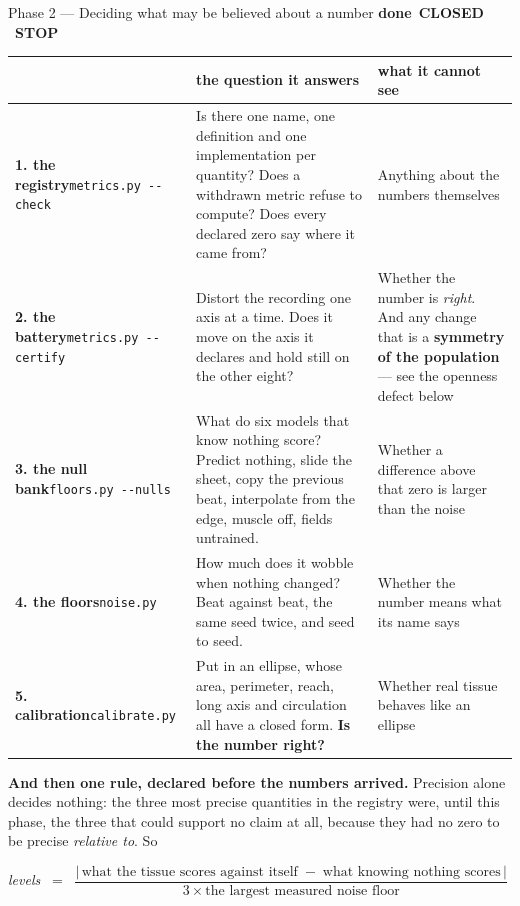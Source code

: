 \documentclass[11pt,a4paper]{article}
\newcommand{\code}[1]{\texttt{#1}}
\newcommand{\dn}{\textcolor{good}{\textbf{done}}}
\newcommand{\stopp}{\textcolor{bad!30!white}{\textbf{STOP}}}
\begin{document}
\begin{phasebox}{Phase 2 --- Deciding what may be believed about a number \hfill \dn\ \textbf{CLOSED} \ \stopp}
\begin{center}\footnotesize
\begin{tabular}{@{}l p{5.0cm} p{4.6cm}@{}}
\toprule
& \textbf{the question it answers} & \textbf{what it cannot see}\\
\midrule
\textbf{1. the registry}\newline\code{metrics.py -{}-check} &
Is there one name, one definition and one implementation per quantity? Does a withdrawn metric
refuse to compute? Does every declared zero say where it came from? &
Anything about the numbers themselves\\
\addlinespace
\textbf{2. the battery}\newline\code{metrics.py -{}-certify} &
Distort the recording one axis at a time. Does it move on the axis it declares and hold still on the
other eight? &
Whether the number is \emph{right}. And any change that is a \textbf{symmetry of the population} ---
see the openness defect below\\
\addlinespace
\textbf{3. the null bank}\newline\code{floors.py -{}-nulls} &
What do six models that know nothing score? Predict nothing, slide the sheet, copy the previous
beat, interpolate from the edge, muscle off, fields untrained. &
Whether a difference above that zero is larger than the noise\\
\addlinespace
\textbf{4. the floors}\newline\code{noise.py} &
How much does it wobble when nothing changed? Beat against beat, the same seed twice, and seed to
seed. &
Whether the number means what its name says\\
\addlinespace
\textbf{5. calibration}\newline\code{calibrate.py} &
Put in an ellipse, whose area, perimeter, reach, long axis and circulation all have a closed form.
\textbf{Is the number right?} &
Whether real tissue behaves like an ellipse\\
\bottomrule
\end{tabular}
\end{center}

\textbf{And then one rule, declared before the numbers arrived.} Precision alone decides nothing:
the three most precise quantities in the registry were, until this phase, the three that could
support no claim at all, because they had no zero to be precise \emph{relative to}. So

\begin{center}
\emph{levels} \ = \ \(\dfrac{\lvert\,\text{what the tissue scores against itself} \; - \;
\text{what knowing nothing scores}\,\rvert}{3 \times \text{the largest measured noise floor}}\)
\end{center}


\end{phasebox}
\end{document}
